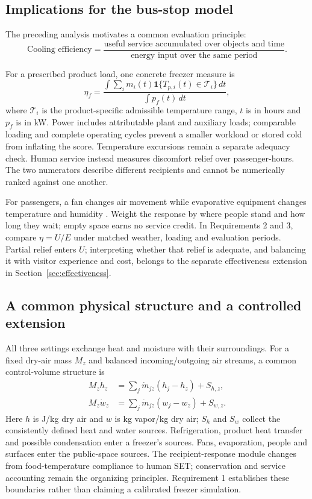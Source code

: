 \documentclass[12pt]{article}
\begin{document}
\subsection{Implications for the bus-stop model}

The preceding analysis motivates a common evaluation principle:
\begin{equation}
\boxed{\text{Cooling efficiency}
=\frac{\text{useful service accumulated over objects and time}}
{\text{energy input over the same period}}.}
\label{eq:principle}
\end{equation}

For a prescribed product load, one concrete freezer measure is
\begin{equation}
 \eta_f=\frac{\int\sum_i m_i(t)\mathbf{1}\{T_{p,i}(t)\in\mathcal T_i\}\,dt}
 {\int p_f(t)\,dt},
\label{eq:freezer-service}
\end{equation}
where $\mathcal T_i$ is the product-specific admissible temperature range, $t$ is in hours and $p_f$ is in kW. Power includes attributable plant and auxiliary loads; comparable loading and complete operating cycles prevent a smaller workload or stored cold from inflating the score. Temperature excursions remain a separate adequacy check. Human service instead measures discomfort relief over passenger-hours. The two numerators describe different recipients and cannot be numerically ranked against one another.

For passengers, a fan changes air movement while evaporative equipment changes temperature and humidity \cite{energystar,evap}. Weight the response by where people stand and how long they wait; empty space earns no service credit. In Requirements 2 and 3, compare $\eta=U/E$ under matched weather, loading and evaluation periods. Partial relief enters $U$; interpreting whether that relief is adequate, and balancing it with visitor experience and cost, belongs to the separate effectiveness extension in Section~\ref{sec:effectiveness}.

\subsection{A common physical structure and a controlled extension}

All three settings exchange heat and moisture with their surroundings. For a fixed dry-air mass $M_z$ and balanced incoming/outgoing air streams, a common control-volume structure is
\begin{align}
 M_z\dot h_z&=\sum_j\dot m_{jz}(h_j-h_z)+S_{h,z},\\
 M_z\dot w_z&=\sum_j\dot m_{jz}(w_j-w_z)+S_{w,z}.
\label{eq:common-balance}
\end{align}
Here $h$ is J/kg dry air and $w$ is kg vapor/kg dry air; $S_h$ and $S_w$ collect the consistently defined heat and water sources. Refrigeration, product heat transfer and possible condensation enter a freezer's sources. Fans, evaporation, people and surfaces enter the public-space sources. The recipient-response module changes from food-temperature compliance to human SET; conservation and service accounting remain the organizing principles. Requirement 1 establishes these boundaries rather than claiming a calibrated freezer simulation.
\end{document}
